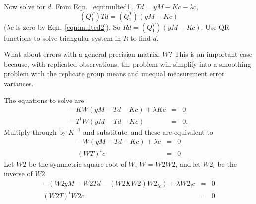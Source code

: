 \documentclass{article}
\begin{document}
Now solve for $d$. From Eqn.~\ref{eqn:multed1}, $Td = yM - Kc - \lambda c$,
\begin{equation}
  (Q_1^T) Td = (Q_1^T) (yM - Kc)
\end{equation}
($\lambda c$ is zero by Eqn.~\ref{eqn:multed2}). So $Rd = (Q_1^T) (yM - Kc)$.
Use QR functions to solve triangular system in $R$ to find $d$.

What about errors with a general precision matrix, $W$? This is an important case because,
with replicated observations, the problem will simplify into a smoothing problem with the replicate group means and unequal measurement error variances.

The equations to solve are
\begin{eqnarray}
  -KW(yM - Td - Kc) + \lambda Kc & = & 0  \\
  -T^t W( yM - Td - Kc ) & = & 0.
\end{eqnarray}
Multiply through by $K^{-1}$ and substitute, and these are equivalent to
\begin{eqnarray}
  -W( yM - Td - Kc) + \lambda c & = & 0 \label{eqn:err1} \\
  (WT)^t c & = & 0 \label{eqn:err2}
\end{eqnarray}
Let $W2$ be the symmetric square root of $W$, $W = W2W2$,
and let $W2_i$ be the inverse of $W2$.
\begin{eqnarray}
  - (W2 yM - W2 T d - (W2 K W2) W2_{ic}) + \lambda W2_i c & = & 0 \label{eqn:1c}\\
  (W2T)^t W2c & = & 0 \label{eqn:2c}
\end{eqnarray}
\end{document}
